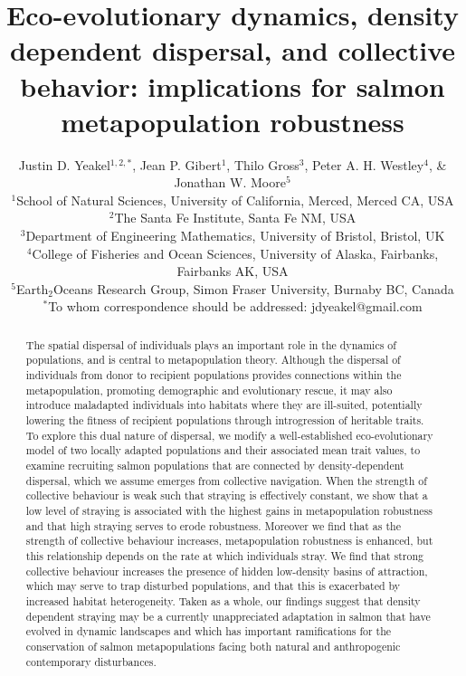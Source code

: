 \documentclass{revtex4}
\begin{document}
\title{Eco-evolutionary dynamics, density dependent dispersal, and collective behavior: implications for salmon metapopulation robustness}
\author{
Justin D. Yeakel${}^{1,2,*}$, Jean P. Gibert${}^{1}$, Thilo Gross${}^3$, Peter A. H. Westley${}^{4}$, \& Jonathan W. Moore${}^{5}$ \\
${}^1$School of Natural Sciences, University of California, Merced, Merced CA, USA \\
${}^2$The Santa Fe Institute, Santa Fe NM, USA \\
${}^3$Department of Engineering Mathematics, University of Bristol, Bristol, UK\\
${}^4$College of Fisheries and Ocean Sciences, University of Alaska, Fairbanks, Fairbanks AK, USA \\
${}^5$Earth${}_2$Oceans Research Group, Simon Fraser University, Burnaby BC, Canada \\
${}^*$To whom correspondence should be addressed: jdyeakel@gmail.com
}




\begin{abstract} %
The spatial dispersal of individuals plays an important role in the dynamics of populations, and is central to metapopulation theory. Although the dispersal of individuals from donor to recipient populations provides connections within the metapopulation, promoting demographic and evolutionary rescue, it may also introduce maladapted individuals into habitats where they are ill-suited, potentially lowering the fitness of recipient populations through introgression of heritable traits. To explore this dual nature of dispersal, we modify a well-established eco-evolutionary model of two locally adapted populations and their associated mean trait values, to examine recruiting salmon populations that are connected by density-dependent dispersal, which we assume emerges from collective navigation. When the strength of collective behaviour is weak such that straying is effectively constant, we show that a low level of straying is associated with the highest gains in metapopulation robustness and that high straying serves to erode robustness. Moreover we find that as the strength of collective behaviour increases, metapopulation robustness is enhanced, but this relationship depends on the rate at which individuals stray. We find that strong collective behaviour increases the presence of hidden low-density basins of attraction, which may serve to trap disturbed populations, and that this is exacerbated by increased habitat heterogeneity. Taken as a whole, our findings suggest that density dependent straying may be a currently unappreciated adaptation in salmon that have evolved in dynamic landscapes and which has important ramifications for the conservation of salmon metapopulations facing both natural and anthropogenic contemporary disturbances.
\end{abstract} 
\end{document}
